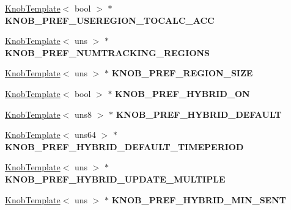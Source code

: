 \begin{DoxyCompactItemize}
\item 
\hypertarget{classall__knobs__c_a7b6d4153a25340517849f45f00e97a64}{
\hyperlink{classKnobTemplate}{KnobTemplate}$<$ bool $>$ $\ast$ {\bfseries KNOB\_\-PREF\_\-USEREGION\_\-TOCALC\_\-ACC}}
\label{classall__knobs__c_a7b6d4153a25340517849f45f00e97a64}

\item 
\hypertarget{classall__knobs__c_a0e8947d7b1080356b443af72aff4e6ca}{
\hyperlink{classKnobTemplate}{KnobTemplate}$<$ uns $>$ $\ast$ {\bfseries KNOB\_\-PREF\_\-NUMTRACKING\_\-REGIONS}}
\label{classall__knobs__c_a0e8947d7b1080356b443af72aff4e6ca}

\item 
\hypertarget{classall__knobs__c_a2ec32efd066ddbf60154951787c2d051}{
\hyperlink{classKnobTemplate}{KnobTemplate}$<$ uns $>$ $\ast$ {\bfseries KNOB\_\-PREF\_\-REGION\_\-SIZE}}
\label{classall__knobs__c_a2ec32efd066ddbf60154951787c2d051}

\item 
\hypertarget{classall__knobs__c_afe0a1e5473337ea745f6ee51daa83e1a}{
\hyperlink{classKnobTemplate}{KnobTemplate}$<$ bool $>$ $\ast$ {\bfseries KNOB\_\-PREF\_\-HYBRID\_\-ON}}
\label{classall__knobs__c_afe0a1e5473337ea745f6ee51daa83e1a}

\item 
\hypertarget{classall__knobs__c_a8c4c805bdae4f6b8e99ceaa5378dab79}{
\hyperlink{classKnobTemplate}{KnobTemplate}$<$ uns8 $>$ $\ast$ {\bfseries KNOB\_\-PREF\_\-HYBRID\_\-DEFAULT}}
\label{classall__knobs__c_a8c4c805bdae4f6b8e99ceaa5378dab79}

\item 
\hypertarget{classall__knobs__c_abfc7084a7187741af88e72d522d0f5b9}{
\hyperlink{classKnobTemplate}{KnobTemplate}$<$ uns64 $>$ $\ast$ {\bfseries KNOB\_\-PREF\_\-HYBRID\_\-DEFAULT\_\-TIMEPERIOD}}
\label{classall__knobs__c_abfc7084a7187741af88e72d522d0f5b9}

\item 
\hypertarget{classall__knobs__c_a8f427a2797a34a9d2654264809fa4a47}{
\hyperlink{classKnobTemplate}{KnobTemplate}$<$ uns $>$ $\ast$ {\bfseries KNOB\_\-PREF\_\-HYBRID\_\-UPDATE\_\-MULTIPLE}}
\label{classall__knobs__c_a8f427a2797a34a9d2654264809fa4a47}

\item 
\hypertarget{classall__knobs__c_a904da45218683f13b76263e1e0f372de}{
\hyperlink{classKnobTemplate}{KnobTemplate}$<$ uns $>$ $\ast$ {\bfseries KNOB\_\-PREF\_\-HYBRID\_\-MIN\_\-SENT}}
\label{classall__knobs__c_a904da45218683f13b76263e1e0f372de}


\end{DoxyCompactItemize}
